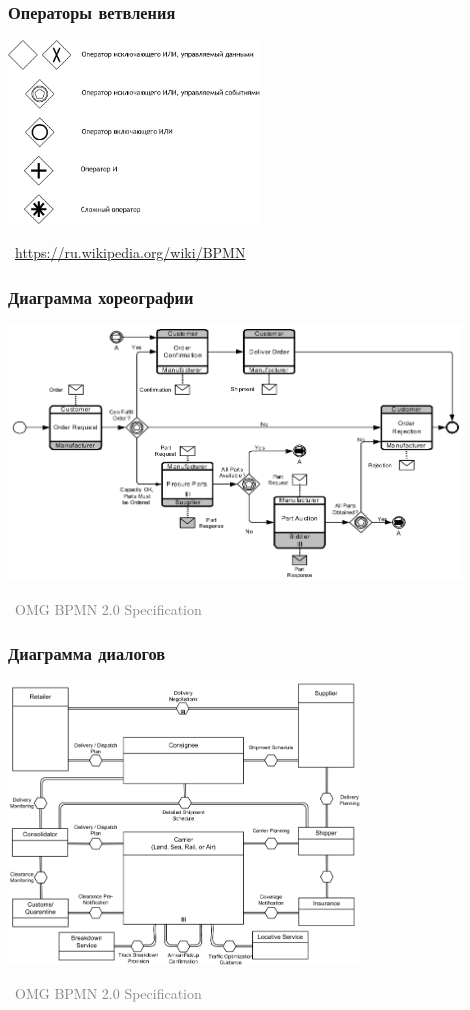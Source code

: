 \documentclass[xetex,mathserif,serif]{beamer}
\newcommand{\attribution}[1] {
	\vspace{-5mm}\begin{flushright}\begin{scriptsize}\textcolor{gray}{\textcopyright\, #1}\end{scriptsize}\end{flushright}
}
\begin{document}
	\begin{frame}
		\frametitle{Операторы ветвления}
		\begin{center}
			\includegraphics[width=0.5\textwidth]{bpmnGateways.png}
			\attribution{\url{https://ru.wikipedia.org/wiki/BPMN}}
		\end{center}
	\end{frame}

	\begin{frame}
		\frametitle{Диаграмма хореографии}
		\begin{center}
			\includegraphics[width=0.9\textwidth]{bpmnChoreography.png}
			\attribution{OMG BPMN 2.0 Specification}
		\end{center}
	\end{frame}

	\begin{frame}
		\frametitle{Диаграмма диалогов}
		\begin{center}
			\includegraphics[width=0.7\textwidth]{bpmnConversation.png}
			\attribution{OMG BPMN 2.0 Specification}
		\end{center}
	\end{frame}
\end{document}
